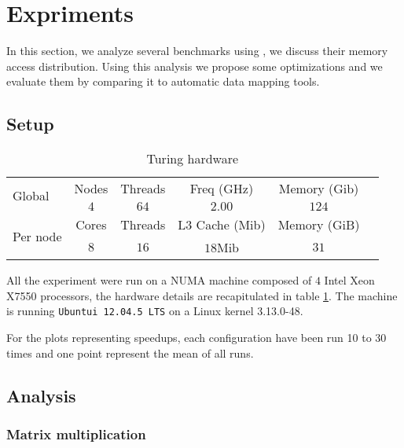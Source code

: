 
\section{Expriments}
\label{sec:expe}

In this section, we analyze several benchmarks using \TABARNAC, we discuss
their memory access distribution. Using this analysis we propose some
optimizations and we evaluate them by comparing it to automatic data mapping
tools.

\subsection{Setup}
\label{sec:expe-setup}

\begin{table}
    \centering
        \begin{tabular}{|l|c|c|c|c|c|}
            \hline
            \multirow{2}{*}{Global} & Nodes & Threads & Freq (GHz) & Memory (Gib) \\
            \cline{2-5}
                & $4$   & $64$ & $2.00$ & $124$ \\
            \hline
           \multirow{2}{*}{Per node} & Cores & Threads & L3 Cache (Mib) & Memory (GiB) \\
            \cline{2-5}
            & $8$ & $16$ & $18$Mib & $31$  \\
            \hline
        \end{tabular}
    \caption{Turing hardware}
    \label{tab:turing}
\end{table}

All the experiment were run on a NUMA machine composed of $4$ Intel Xeon X7550
processors, the hardware details are recapitulated in table \ref{tab:turing}.
The machine is running \texttt{Ubuntui 12.04.5 LTS} on a Linux kernel 3.13.0-48.

For the plots representing speedups, each configuration have been run 10 to 30
times and one point represent the mean of all runs.

\subsection{Analysis}
\label{sec:expe-analysis}

\subsubsection{Matrix multiplication}
\label{sec:exp-mat}

